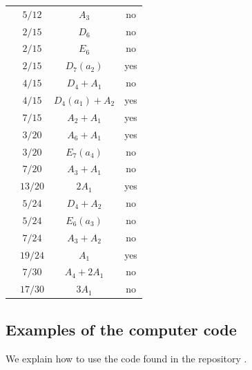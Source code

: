 \documentclass[11pt]{amsart}
\theoremstyle{definition}
\begin{document}
\begin{table}[H]
\begin{center}
\begin{tabular}{|c|c|c|c|}
${}$          		& $5/12$  	& $A_3$ 			& \color{red}no                		\\
${}$          		& $2/15$  	& $D_6$ 			& \color{red}no                		\\
${}$          		& $2/15$  	& $E_6$ 			& \color{red}no                		\\
${}$          		& $2/15$  	& $D_7(a_2)$ 		& \color{red}yes           	\\
${}$          		& $4/15$  	& $D_4+A_1$ 		& \color{red}no            	\\
${}$          		& $4/15$  	& $D_4(a_1)+A_2$ 	& \color{red}yes       	\\
${}$          		& $7/15$  	& $A_2+A_1$ 		& \color{red}yes            	\\
${}$          		& $3/20$  	& $A_6+A_1$ 		& \color{red}yes            	\\
${}$          		& $3/20$  	& $E_7(a_4)$ 		& \color{red}no           	\\
${}$          		& $7/20$  	& $A_3+A_1$ 		& \color{red}no            	\\
${}$          		& $13/20$ 	& $2A_1$ 			& \color{red}yes               	\\
${}$          		& $5/24$  	& $D_4+A_2$ 		& \color{red}no            	\\
${}$          		& $5/24$  	& $E_6(a_3)$ 		& \color{red}no           	\\
${}$          		& $7/24$  	& $A_3+A_2$ 		& \color{red}no            	\\
${}$          		& $19/24$ 	& $A_1$ 			& \color{red}yes                		\\
${}$          		& $7/30$  	& $A_4+2A_1$ 		& no           	\\
${}$          		& $17/30$ 	& $3A_1$ 			& no               	\\
\hline
\end{tabular}
\end{center}
\label{t:rigid}
\end{table}




\subsection{Examples of the computer code} \label{ss:examplecode}
We explain how to use the code found in the repository \cite{Whitbread}.
\end{document}
